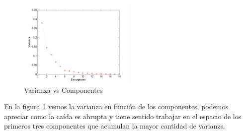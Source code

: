 \documentclass[12pt,a4paper,titlepage]{report}
\begin{document}
\begin{figure}
	\vspace{-25pt}
	\begin{center}
		\includegraphics[width=0.5\textwidth]{pics/varianzaPCA}
	\end{center}
	\vspace{-20pt}
	\caption{Varianza vs Componentes}
	\label{varianzaPCA}
	\vspace{-10pt}
\end{figure}

En la figura \ref{varianzaPCA} vemos la varianza en función de los componentes, podemos apreciar como la caída es abrupta y tiene sentido trabajar en el espacio de los primeros tres componentes que acumulan la mayor cantidad de varianza.\\
\end{document}
